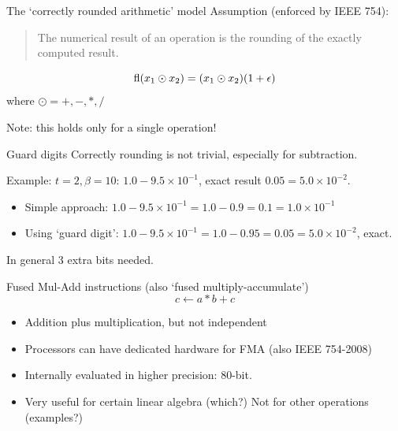 \begin{numberedframe}{The `correctly rounded arithmetic' model}
Assumption (enforced by IEEE 754):
\begin{quotation}
  The numerical result of an operation is the rounding of the exactly
  computed result.
\end{quotation}
\[ \mathop{\mathrm{fl}}(x_1\odot x_2) = (x_1\odot x_2)(1+\epsilon) \]
where $\odot=+,-,*,/$

Note: this holds only for a single operation!
\end{numberedframe}

\begin{numberedframe}{Guard digits}
Correctly rounding is not trivial, especially for subtraction.

Example: $t=2, \beta=10$: $1.0-9.5\times 10^{-1}$, exact result
$0.05=5.0\times 10^{-2}$.
\begin{itemize}
\item Simple approach: $1.0-9.5\times 10^{-1}=1.0-0.9=0.1=1.0\times
  10^{-1}$
\item Using `guard digit': $1.0-9.5\times
  10^{-1}=1.0-0.95=0.05=5.0\times 10^{-2}$, exact.
\end{itemize}
In general 3 extra bits needed.
\end{numberedframe}

\begin{numberedframe}{Fused Mul-Add instructions}
  (also `fused multiply-accumulate')
  \[ c\leftarrow a*b+c \]
  \begin{itemize}
  \item Addition plus multiplication, but not independent
  \item Processors can have dedicated hardware for FMA (also IEEE
    754-2008)
  \item Internally evaluated in higher precision: 80-bit.
  \item Very useful for certain linear algebra (which?) Not for other
    operations (examples?)
  \end{itemize}
  
\end{numberedframe}

